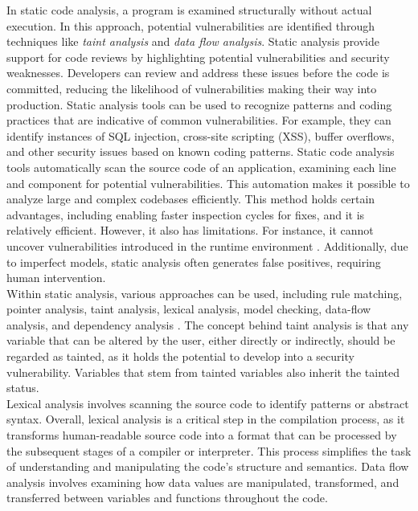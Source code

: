 In static code analysis, a program is examined structurally without actual execution. In this approach, potential vulnerabilities are identified \cite{5066568} through techniques like \textit{taint analysis} and \textit{data flow analysis}. Static analysis provide support for code reviews by highlighting potential vulnerabilities and security weaknesses. Developers can review and address these issues before the code is committed, reducing the likelihood of vulnerabilities making their way into production. Static analysis tools can be used to recognize patterns and coding practices that are indicative of common vulnerabilities. For example, they can identify instances of SQL injection, cross-site scripting (XSS), buffer overflows, and other security issues based on known coding patterns. Static code analysis tools automatically scan the source code of an application, examining each line and component for potential vulnerabilities. This automation makes it possible to analyze large and complex codebases efficiently. This method holds certain advantages, including enabling faster inspection cycles for fixes, and it is relatively efficient. However, it also has limitations. For instance, it cannot uncover vulnerabilities introduced in the runtime environment \cite{5066568}. Additionally, due to imperfect models, static analysis often generates false positives, requiring human intervention.\\

Within static analysis, various approaches can be used, including rule matching, pointer analysis, taint analysis, lexical analysis, model checking, data-flow analysis, and dependency analysis \cite{Mukesh_Kumar_2015, Bingchang_2012}. The concept behind taint analysis is that any variable that can be altered by the user, either directly or indirectly, should be regarded as tainted, as it holds the potential to develop into a security vulnerability. Variables that stem from tainted variables also inherit the tainted status.\\ 

Lexical analysis involves scanning the source code to identify patterns or abstract syntax. Overall, lexical analysis is a critical step in the compilation process, as it transforms human-readable source code into a format that can be processed by the subsequent stages of a compiler or interpreter. This process simplifies the task of understanding and manipulating the code's structure and semantics. Data flow analysis involves examining how data values are manipulated, transformed, and transferred between variables and functions throughout the code.\\

